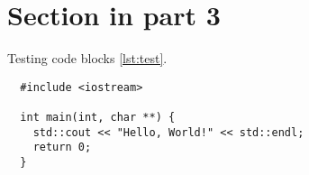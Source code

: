 
\section{Section in part 3}

Testing code blocks \ref{lst:test}.

\begin{verbatim}
  #include <iostream>

  int main(int, char **) {
    std::cout << "Hello, World!" << std::endl;
    return 0;
  }
\end{verbatim}
\label{lst:test}
